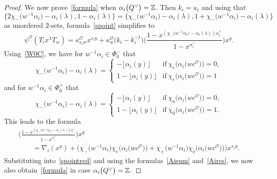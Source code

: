 \documentclass[11pt]{article}
\numberwithin{equation}{section}
\numberwithin{equation}{section}
\begin{document}
\begin{proof}
We now prove~\eqref{formula} when $\alpha_i\smash{\bigl(Q^\vee\bigr)}=\mathbb{Z}$. Then $k_i=u_i$ and using that
\[
\bigl\{2\chi_-\bigl(w^{-1}\alpha_i\bigr)-\alpha_i(\lambda), 1-\alpha_i(\lambda)\bigr\}=\bigl\{\chi_-\bigl(w^{-1}\alpha_i\bigr)-\alpha_i(\lambda),1+\chi_-\bigl(w^{-1}\alpha_i\bigr)-\alpha_i(\lambda)\bigr\}
\]
as unordered $2$-sets,
formula~\eqref{spoint} simplifies to
\begin{equation}\label{spointred}
\psi^\mathcal{O}(T_ix^\lambda T_w)=\kappa_{s_iw}^\mathcal{O}x^{s_iy}
+\kappa_w^\mathcal{O}\bigl(k_i-k_i^{-1}\bigr)\Biggl(\frac{1-x^{(\chi_-\bigl(w^{-1}\alpha_i\bigr)-\alpha_i(\lambda))\alpha_i^\vee}}{1-x^{\alpha_i^\vee}}\Biggr)x^{y}.
\end{equation}
Using~\eqref{W0C}, we have for $w^{-1}\alpha_i\in\Phi_0^-$ that
\begin{equation*}
\chi_-\bigl(w^{-1}\alpha_i\bigr)-\alpha_i(\lambda)=
\begin{cases}
-\lfloor\alpha_i(y)\rfloor &\text{if}\ \chi_e\bigl(\alpha_i\bigl(wc^\mathcal{O}\bigr)\bigr)=0,\\
1-\lfloor\alpha_i(y)\rfloor &\text{if}\ \chi_e\bigl(\alpha_i\bigl(wc^\mathcal{O}\bigr)\bigr)=1
\end{cases}
\end{equation*}
and for $w^{-1}\alpha_i\in\Phi_0^+$ that
\begin{equation*}
\chi_-\bigl(w^{-1}\alpha_i\bigr)-\alpha_i(\lambda)=
\begin{cases}
-\lfloor\alpha_i(y)\rfloor &\text{if}\ \chi_o\bigl(\alpha_i\bigl(wc^\mathcal{O}\bigr)\bigr)=0,\\
1-\lfloor\alpha_i(y)\rfloor &\text{if}\ \chi_0\bigl(\alpha_i\bigl(wc^\mathcal{O}\bigr)\bigr)=1.
\end{cases}
\end{equation*}
This leads to the formula
\begin{gather*}
\Biggl(\frac{1-x^{(\chi_-\bigl(w^{-1}\alpha_i\bigr)-\alpha_i(\lambda))\alpha_i^\vee}}{1-x^{\alpha_i^\vee}}\Biggr)x^{y}\\
\qquad{}{}=
\nabla_i(x^y)+\bigl(\chi_-\bigl(w^{-1}\alpha_i\bigr)\chi_e\bigl(\alpha_i\bigl(wc^\mathcal{O}\bigr)\bigr)+\chi_+\bigl(w^{-1}\alpha_i\bigr)\chi_o\bigl(\alpha_i\bigl(wc^\mathcal{O}\bigr)\bigr)\bigr)x^{s_iy}.
\end{gather*}
Substituting into~\eqref{spointred} and using the formulas~\eqref{Aisum} and~\eqref{Aires}, we now also obtain~\eqref{formula} in case $\alpha_i\smash{\bigl(Q^\vee\bigr)}=\mathbb{Z}$.



\end{proof}
\end{document}
